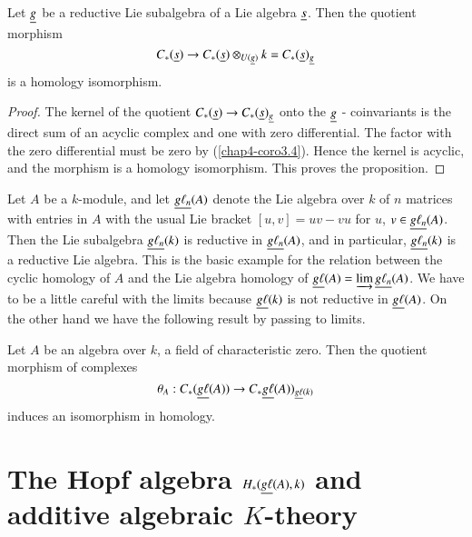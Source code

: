 \begin{proposition}\label{chap4-prop3.7}
Let $\underline{g}$ be a reductive Lie subalgebra of a Lie algebra
$\underline{s}$. Then the quotient morphism
$$
C_{\ast}(\underline{s})\to
C_{\ast}(\underline{s})\otimes_{U(\underline{g})}k=C_{\ast}(\underline{s})_{\underline{g}}
$$
is a homology isomorphism.
\end{proposition}

\begin{proof}
The kernel of the quotient $C_{\ast}(\underline{s})\to
C_{\ast}(\underline{s})_{\underline{g}}$ onto the $\underline{g}$ - coinvariants is the
direct sum of an acyclic complex and one with zero differential. The
factor with the zero differential must be zero by
(\ref{chap4-coro3.4}). Hence the kernel is acyclic, and the morphism
is a homology isomorphism. This proves the proposition.
\end{proof}

\begin{example}\label{chap4-exam3.8}
Let $A$ be a $k$-module, and let $\underline{g\ell_{n}}(A)$ denote the Lie
algebra over $k$ of $n$ matrices with entries in $A$ with the usual
Lie bracket $[u,v]=uv-vu$ for $u$, $v\in \underline{g\ell_{n}}(A)$. Then the
Lie subalgebra $\underline{g\ell_{n}}(k)$ is reductive in
$\underline{g\ell_{n}}(A)$, and in particular, $\underline{g\ell_{n}}(k)$ is a
reductive Lie algebra. This is the basic example for the relation
between the cyclic homology of $A$ and the Lie algebra homology of
$\underline{g\ell}(A)=\varinjlim\underline{g\ell_{n}}(A)$.  We have to be a little
careful with the limits because $\underline{g\ell}(k)$ is not reductive in
$\underline{g\ell}(A)$. On the other hand we have the following result by
passing to limits.
\end{example}

\begin{proposition}\label{chap4-prop3.9}
Let $A$ be an algebra over $k$, a field of characteristic zero. Then
the quotient morphism of complexes
$$
\theta_{A}:C_{\ast}(\underline{g\ell}(A))\to
C_{\ast}\underline{g\ell}(A))_{\underline{g\ell}(k)}
$$
induces an isomorphism in homology.
\end{proposition}

\section[The Hopf algebra $H_{\ast}(\protect\underline{g\ell}(A),k)$
  and...]{The Hopf algebra $H_{\ast}(\protect\underline{g\ell}(A),k)$
  and additive 
  algebraic $K$-theory}\label{chap4-sec4}

